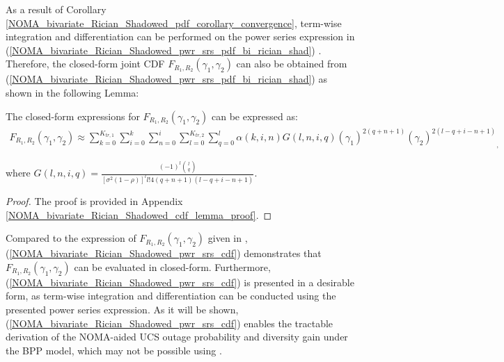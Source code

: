 As a result of Corollary \ref{NOMA_bivariate_Rician_Shadowed_pdf_corollary_convergence}, term-wise integration and differentiation can be performed on the power series expression in (\ref{NOMA_bivariate_Rician_Shadowed_pwr_srs_pdf_bi_rician_shad}) \cite{amann2005analysis,gradshteyn2014table}. Therefore, the closed-form joint CDF $F_{R_1,R_2}(\gamma_1,\gamma_2)$ can also be obtained from (\ref{NOMA_bivariate_Rician_Shadowed_pwr_srs_pdf_bi_rician_shad}) as shown in the following Lemma:
\begin{lemma} \label{NOMA_bivariate_Rician_Shadowed_lemma_pwr_srs_cdf_bi_rician_shad}
The closed-form expressions for $F_{R_1,R_2}(\gamma_1,\gamma_2)$ can be expressed as:
\begin{eqnarray} 
F_{R_1,R_2}(\gamma_1,\gamma_2)\approx \sum_{k=0}^{K_{tr,1}} \sum_{i=0}^{k} \sum_{n=0}^{i} \sum_{l=0}^{K_{tr,2}} \sum_{q=0}^{l} \alpha(k,i,n) G(l,n,i,q) (\gamma_1)^{2(q+n+1)} {(\gamma_2)^{2(l-q+i-n+1)}}_, \label{NOMA_bivariate_Rician_Shadowed_pwr_srs_cdf}
\end{eqnarray}
\end{lemma}
where $G(l,n,i,q) = \frac{(-1)^l \binom{l}{q}}{[\sigma^2(1-\rho)]^{l} l! 4 (q+n+1) (l-q+i-n+1)}$.

\begin{proof}
The proof is provided in Appendix \ref{NOMA_bivariate_Rician_Shadowed_cdf_lemma_proof}.
\end{proof}

Compared to the expression of $F_{R_1,R_2}(\gamma_1,\gamma_2)$ given in \cite[eq. (23)]{lopez2018bivariate}, (\ref{NOMA_bivariate_Rician_Shadowed_pwr_srs_cdf}) demonstrates that $F_{R_1,R_2}(\gamma_1,\gamma_2)$ can be evaluated in closed-form. Furthermore, (\ref{NOMA_bivariate_Rician_Shadowed_pwr_srs_cdf}) is presented in a desirable form, as term-wise integration and differentiation can be conducted using the presented power series expression. As it will be shown, (\ref{NOMA_bivariate_Rician_Shadowed_pwr_srs_cdf}) enables the tractable derivation of the NOMA-aided UCS outage probability and diversity gain under the BPP model, which may not be possible using \cite[eq. (23)]{lopez2018bivariate}.

